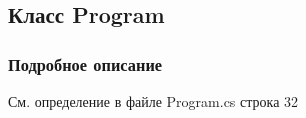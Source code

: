 \subsection{Класс Program}
\label{classkdz__manager_1_1_program}


\subsubsection{Подробное описание}


См. определение в файле Program.\+cs строка 32

